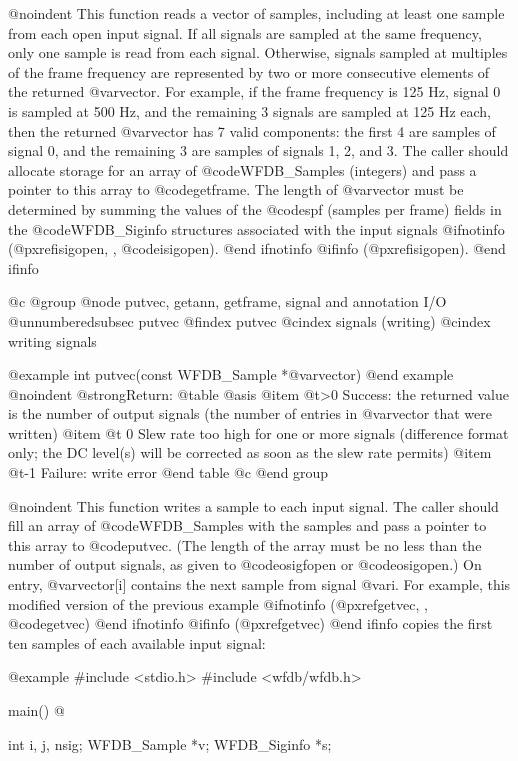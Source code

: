 {{{{{{{{@noindent
This function reads a vector of samples, including at least one sample from
each open input signal.  If all signals are sampled at the same frequency, only
one sample is read from each signal.  Otherwise, signals sampled at multiples
of the frame frequency are represented by two or more consecutive elements of
the returned @var{vector}.  For example, if the frame frequency is 125 Hz,
signal 0 is sampled at 500 Hz, and the remaining 3 signals are sampled at 125
Hz each, then the returned @var{vector} has 7 valid components: the first 4 are
samples of signal 0, and the remaining 3 are samples of signals 1, 2, and 3.
The caller should allocate storage for an array of @code{WFDB_Sample}s
(integers) and pass a pointer to this array to @code{getframe}.  The length of
@var{vector} must be determined by summing the values of the @code{spf}
(samples per frame) fields in the @code{WFDB_Siginfo} structures associated
with the input signals
@ifnotinfo
(@pxref{isigopen, , @code{isigopen}}).
@end ifnotinfo
@ifinfo
(@pxref{isigopen}).
@end ifinfo

@c @group
@node     putvec, getann, getframe, signal and annotation I/O
@unnumberedsubsec putvec
@findex putvec
@cindex signals (writing)
@cindex writing signals

@example
int putvec(const WFDB_Sample *@var{vector})
@end example
@noindent
@strong{Return:}
@table @asis
@item @t{>0}
Success: the returned value is the number of output signals (the number
of entries in @var{vector} that were written)
@item @t{ 0}
Slew rate too high for one or more signals (difference format only; the
DC level(s) will be corrected as soon as the slew rate permits)
@item @t{-1}
Failure: write error
@end table
@c @end group

@noindent
This function writes a sample to each input signal.  The caller should fill an
array of @code{WFDB_Sample}s with the samples and pass a pointer to this array
to @code{putvec}.  (The length of the array must be no less than the number of
output signals, as given to @code{osigfopen} or @code{osigopen}.)  On entry,
@var{vector[i]} contains the next sample from signal @var{i}.  For example,
this modified version of the previous example
@ifnotinfo
(@pxref{getvec, , @code{getvec}})
@end ifnotinfo
@ifinfo
(@pxref{getvec})
@end ifinfo
copies the first ten samples of each available input signal:

@example
#include <stdio.h>
#include <wfdb/wfdb.h>

main()
@{
    int i, j, nsig;
    WFDB_Sample *v;
    WFDB_Siginfo *s;

}}}}}}}}}
